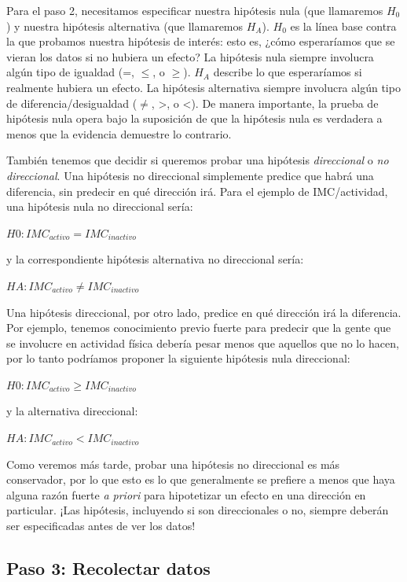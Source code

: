 \documentclass[
  12pt,
]{book}
\begin{document}
Para el paso 2, necesitamos especificar nuestra hipótesis nula (que llamaremos \(H_0\)) y nuestra hipótesis alternativa (que llamaremos \(H_A\)). \(H_0\) es la línea base contra la que probamos nuestra hipótesis de interés: esto es, ¿cómo esperaríamos que se vieran los datos si no hubiera un efecto? La hipótesis nula siempre involucra algún tipo de igualdad (=, \(\le\), o \(\ge\)). \(H_A\) describe lo que esperaríamos si realmente hubiera un efecto. La hipótesis alternativa siempre involucra algún tipo de diferencia/desigualdad (\(\ne\), \textgreater, o \textless). De manera importante, la prueba de hipótesis nula opera bajo la suposición de que la hipótesis nula es verdadera a menos que la evidencia demuestre lo contrario.

También tenemos que decidir si queremos probar una hipótesis \emph{direccional} o \emph{no direccional}. Una hipótesis no direccional simplemente predice que habrá una diferencia, sin predecir en qué dirección irá. Para el ejemplo de IMC/actividad, una hipótesis nula no direccional sería:

\(H0: IMC_{activo} = IMC_{inactivo}\)

y la correspondiente hipótesis alternativa no direccional sería:

\(HA: IMC_{activo} \neq IMC_{inactivo}\)

Una hipótesis direccional, por otro lado, predice en qué dirección irá la diferencia. Por ejemplo, tenemos conocimiento previo fuerte para predecir que la gente que se involucre en actividad física debería pesar menos que aquellos que no lo hacen, por lo tanto podríamos proponer la siguiente hipótesis nula direccional:

\(H0: IMC_{activo} \ge IMC_{inactivo}\)

y la alternativa direccional:

\(HA: IMC_{activo} < IMC_{inactivo}\)

Como veremos más tarde, probar una hipótesis no direccional es más conservador, por lo que esto es lo que generalmente se prefiere a menos que haya alguna razón fuerte \emph{a priori} para hipotetizar un efecto en una dirección en particular. ¡Las hipótesis, incluyendo si son direccionales o no, siempre deberán ser especificadas antes de ver los datos!

\hypertarget{paso-3-recolectar-datos}{%
\subsection{Paso 3: Recolectar datos}\label{paso-3-recolectar-datos}}
\end{document}
